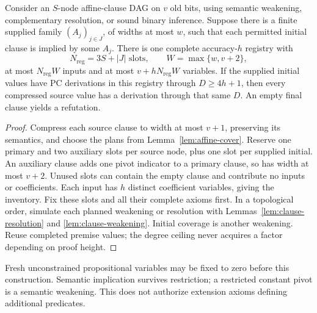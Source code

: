 \begin{theorem}\label{thm:dag-registry}
Consider an \(S\)-node affine-clause DAG on \(v\) old bits, using semantic
weakening, complementary resolution, or sound binary inference. Suppose
there is a finite supplied family \((A_j)_{j\in J}\), of widths at most
\(w\), such that each permitted initial clause is implied by some \(A_j\).
There is one complete accuracy-\(h\) registry with
\[
 N_{\mathrm{reg}}=3S+|J|\text{ slots},\qquad W=\max\{w,v+2\},
\]
at most \(N_{\mathrm{reg}}W\) inputs and at most \(v+hN_{\mathrm{reg}}W\) variables. If the supplied
initial values have PC derivations in this registry through
\(D\ge4h+1\), then every compressed source value has a derivation through
that same \(D\). An empty final clause yields a refutation.
\end{theorem}
\begin{proof}
Compress each source clause to width at most \(v+1\), preserving its
semantics, and choose the plans from Lemma~\ref{lem:affine-cover}.
Reserve one primary and two auxiliary slots per source node, plus one
slot per supplied initial. An auxiliary clause adds one pivot indicator
to a primary clause, so has width at most \(v+2\). Unused slots can
contain the empty clause and contribute no inputs or coefficients.
Each input has \(h\) distinct coefficient variables, giving the inventory.
Fix these slots and all their complete axioms first. In a topological
order, simulate each planned weakening or resolution with
Lemmas~\ref{lem:clause-resolution} and \ref{lem:clause-weakening}.
Initial coverage is another weakening. Reuse completed premise values;
the degree ceiling never acquires a factor depending on proof height.
\end{proof}

Fresh unconstrained propositional variables may be fixed to zero before
this construction. Semantic implication survives restriction; a restricted
constant pivot is a semantic weakening. This does not authorize extension
axioms defining additional predicates.

